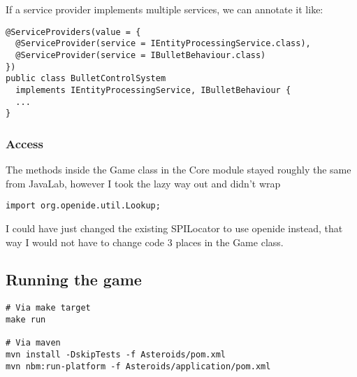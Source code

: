 If a service provider implements multiple services, we can annotate it like:

\begin{verbatim}
@ServiceProviders(value = {
  @ServiceProvider(service = IEntityProcessingService.class),
  @ServiceProvider(service = IBulletBehaviour.class)
})
public class BulletControlSystem
  implements IEntityProcessingService, IBulletBehaviour {
  ...
}
\end{verbatim}

\subsubsection{Access}
The methods inside the Game class in the Core module stayed roughly the same
from JavaLab, however I took the lazy way out and didn't wrap 
\begin{verbatim}
import org.openide.util.Lookup;
\end{verbatim}
I could have just changed the existing SPILocator to use openide instead, that way
I would not have to change code 3 places in the Game class.


\subsection{Running the game}
\begin{verbatim}
# Via make target
make run

# Via maven
mvn install -DskipTests -f Asteroids/pom.xml
mvn nbm:run-platform -f Asteroids/application/pom.xml
\end{verbatim}

